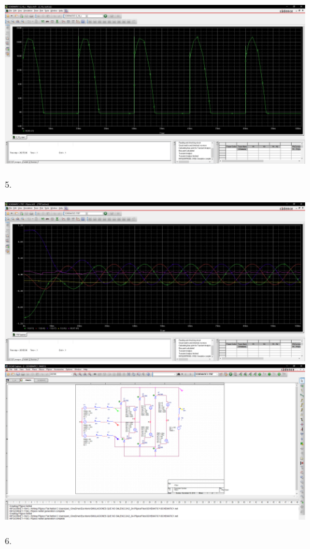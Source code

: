 \documentclass[letterpaper]{article}
\begin{document}
\begin{large}
    \includegraphics[width=13cm]{img/Sim/44.png}\\\\
    5.\\\\
    \includegraphics[width=13cm]{img/Sim/5.png}\\
    \includegraphics[width=13cm]{img/Sim/55.png}\\\\
    6.\\\\
    
\end{large}
\end{document}
